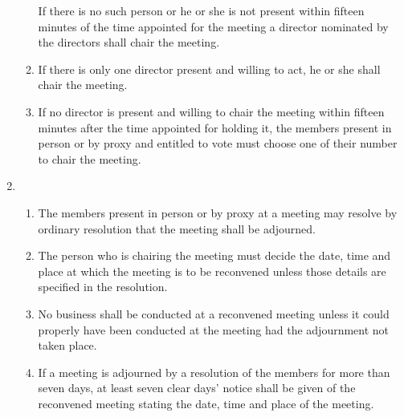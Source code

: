 \begin{enumerate}
\begin{enumerate}
    If there is no such person or he or she is not present within
    fifteen minutes of the time appointed for the meeting a director
    nominated by the directors shall chair the meeting.
  \item
    If there is only one director present and willing to act, he or she
    shall chair the meeting.
  \item
    If no director is present and willing to chair the meeting within
    fifteen minutes after the time appointed for holding it, the
    members present in person or by proxy and entitled to vote must
    choose one of their number to chair the meeting.
  \end{enumerate}
\item
  \begin{enumerate}
  \item
    The members present in person or by proxy at a meeting may resolve
    by ordinary resolution that the meeting shall be adjourned.
  \item
    The person who is chairing the meeting must decide the date, time
    and place at which the meeting is to be reconvened unless those
    details are specified in the resolution.
  \item
    No business shall be conducted at a reconvened meeting unless it
    could properly have been conducted at the meeting had the
    adjournment not taken place.
  \item
    If a meeting is adjourned by a resolution of the members for more
    than seven days, at least seven clear days' notice shall be given
    of the reconvened meeting stating the date, time and place of the
    meeting.
  \end{enumerate}


\end{enumerate}
